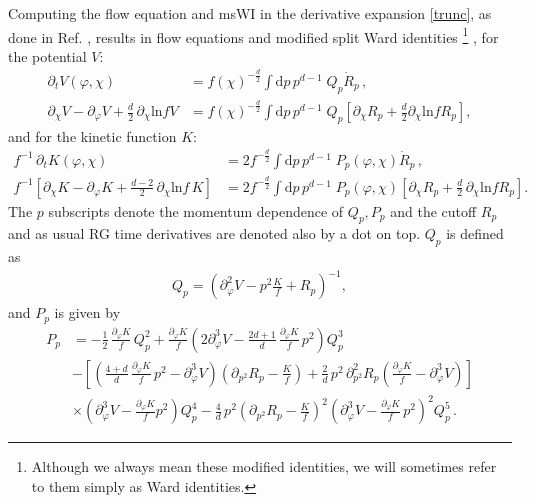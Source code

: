 \documentclass[11pt]{book}
\numberwithin{equation}{chapter}
\begin{document}
Computing the flow equation and msWI in the derivative expansion \eqref{trunc}, as done
in Ref. \cite{Dietz:2015owa}, results in flow equations
and modified split Ward identities%
\footnote{
  Although we always mean these modified identities,
  we will sometimes refer to them  simply as Ward identities.
}%
, for the potential $V$:
\begin{align}
  \label{flowV}
  \partial_t V(\varphi,\chi)
  &= f(\chi)^{-\frac{d}{2}} \int \mathrm dp\, p^{d-1} \; Q_p \dot R_p \,, \\
  \label{msWIV}
  \partial_\chi V - \partial_\varphi V + \frac{d}{2} \, \partial_\chi \text{ln} f V
  &= f(\chi)^{-\frac{d}{2}} \int \mathrm dp\, p^{d-1} \; Q_p
  \left[
    \partial_\chi R_p + \frac{d}{2}\partial_\chi \text{ln} f  R_p
  \right] ,
\end{align}
and for the kinetic function $K$:
\begin{align}
  \label{flowK}
  f^{-1} \, \partial_t K(\varphi,\chi)
  &= 2 f^{-\frac{d}{2}} \int \mathrm dp \, p^{d-1} \; P_p(\varphi,\chi)\dot R_p \,,\\
  \label{msWIK}
  f^{-1}
  \left[
    \partial_\chi K- \partial_\varphi K + \frac{d-2}{2} \, \partial_\chi \text{ln}f \, K
  \right]
  &= 2 f^{-\frac{d}{2}} \int \mathrm dp \, p^{d-1} \; P_p(\varphi,\chi)
  \left[
    \partial_{\chi} R_p + \frac{d}{2} \, \partial_\chi \mathrm{ln} f R_p
  \right].
\end{align}
The $p$ subscripts denote the momentum dependence of $Q_p, P_p$ and the cutoff $R_p$ and as
usual RG time derivatives are denoted also by a dot on top. $Q_p$ is defined as
\begin{align}
	Q_p = \left( \partial^2_\varphi V - p^2\frac{K}{f} + R_p \right)^{-1} ,
	\label{Q}
\end{align}
and $P_p$ is given by
\begin{align}
	P_p &= - \frac{1}{2} \, \frac{\partial_\varphi K}{f} \, Q_p^2
	+ \frac{\partial_\varphi K}{f}
  \left(
    2 \partial_\varphi^3 V
    - \frac{2d+1}{d} \, \frac{\partial_{\varphi}K}{f} \, p^2
  \right) Q_p^3 \nonumber \\
  & -
  \left[
    \left(
      \frac{4+d}{d} \, \frac{\partial_\varphi K}{f} \, p^2
      - \partial^3_\varphi V
    \right)
    \left(
      \partial_{p^2} R_p - \frac{K}{f}
    \right)
    + \frac{2}{d} \, p^2 \, \partial^2_{p^2} R_p
    \left(
      \frac{\partial_\varphi K}{f} - \partial_\varphi^3 V
    \right)
  \right] \nonumber \\
  & \times \left(\partial_\varphi^3 V - \frac{\partial_\varphi K}{f}p^2\right)Q_p^4
  -\frac{4}{d} \, p^2
  \left(
    \partial_{p^2}R_p-\frac{K}{f}
  \right)^2
  \left(
    \partial_\varphi^3 V - \frac{\partial_\varphi K}{f} \, p^2
  \right)^2 Q_p^5 \,.
\end{align}
\end{document}
